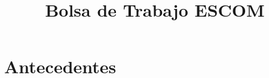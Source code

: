 \documentclass[11pt, twopages]{book}
\date{}
\title{Bolsa de Trabajo ESCOM}
\author{}
\begin{document}
    \frontmatter
        \maketitle
        \tableofcontents
        \listoffigures
        \listoftables
    \mainmatter
    


    \chapter{Antecedentes}
        \label{aloneparts:antecedentes}
        

    
        
    
        

   
\end{document}
